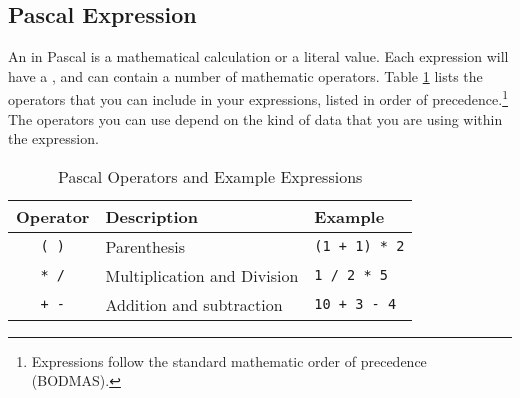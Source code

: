 \clearpage
\subsection{Pascal Expression} %
\label{sub:program-creation-pas_expression}

An  in Pascal is a mathematical calculation or a literal value. Each expression will have a , and can contain a number of mathematic operators. Table \ref{tbl:program-creation-pas operators and expresions} lists the operators that you can include in your expressions, listed in order of precedence.\footnote{Expressions follow the standard mathematic order of precedence (BODMAS).} The operators you can use depend on the kind of data that you are using within the expression.

\begin{table}[h]
  \centering
  \begin{tabular}{|c|l|l|}
    \hline
    \textbf{Operator} & \textbf{Description} & \textbf{Example} \\
    \hline
    \texttt{ ( ) }     &   Parenthesis                 & \texttt{(1 + 1) * 2}  \\
    \texttt{* /}      &   Multiplication and Division & \texttt{1 / 2 * 5}    \\
    \texttt{+ -}      &   Addition and subtraction    & \texttt{10 + 3 - 4}   \\
    \hline
  \end{tabular}
  \caption{Pascal Operators and Example Expressions}
  \label{tbl:program-creation-pas operators and expresions}
\end{table}

